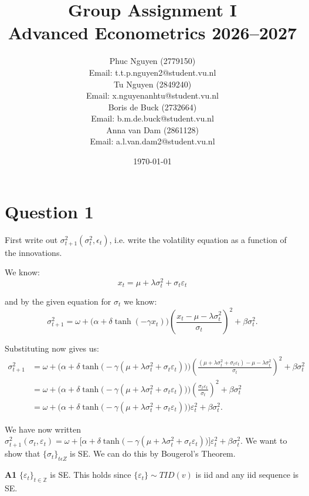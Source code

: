 \documentclass[a4paper, 12pt]{article}
\title{\Huge Group Assignment I\\[0.5em]\large Advanced Econometrics 2026--2027}
\author{\large Phuc Nguyen (2779150)\\\normalsize Email: t.t.p.nguyen2@student.vu.nl\\[0.3cm]
\large Tu Nguyen (2849240)\\\normalsize Email: x.nguyenanhtu@student.vu.nl\\[0.3cm]
\large Boris de Buck (2732664)\\\normalsize Email: b.m.de.buck@student.vu.nl\\[0.3cm]
\large Anna van Dam (2861128)\\\normalsize Email: a.l.van.dam2@student.vu.nl}
\date{\today}
\theoremstyle{definition}
\begin{document}
\maketitle
\newpage


\section*{Question 1}

First write out $\sigma^2_{t+1}(\sigma_t^2, \epsilon_t)$, i.e. write the volatility equation as a function of the
innovations.

We know:
\[x_t=\mu+\lambda\sigma_t^2+\sigma_t\varepsilon_t
\]

and by the given equation for $\sigma_t$ we know:
\[
\sigma_{t+1}^2=\omega+\Big(\alpha+\delta\tanh(-\gamma x_t)\Big)\left(\frac{x_t-\mu-\lambda\sigma_t^2}{\sigma_t}\right)^2+\beta\sigma_t^2.
\]

Substituting now gives us:
\begin{align*}
\sigma_{t+1}^2&=\omega+\Big(\alpha+\delta\tanh\big(-\gamma(\mu+\lambda\sigma_t^2+\sigma_t\varepsilon_t)\big)\Big)\left(\frac{(\mu+\lambda\sigma_t^2+\sigma_t\varepsilon_t)-\mu-\lambda\sigma_t^2}{\sigma_t}\right)^2+\beta\sigma_t^2 \\[4pt]
&=\omega+\Big(\alpha+\delta\tanh\big(-\gamma(\mu+\lambda\sigma_t^2+\sigma_t\varepsilon_t)\big)\Big)\left(\frac{\sigma_t\varepsilon_t}{\sigma_t}\right)^2+\beta\sigma_t^2 \\[4pt]
&=\omega+\Big(\alpha+\delta\tanh\big(-\gamma(\mu+\lambda\sigma_t^2+\sigma_t\varepsilon_t)\big)\Big)\varepsilon_t^2+\beta\sigma_t^2.
\end{align*}

We have now written $\sigma_{t+1}^2(\sigma_t, \varepsilon_t)=\omega+\Big[\alpha+\delta\tanh\big(-\gamma(\mu+\lambda\sigma_t^2+\sigma_t\varepsilon_t)\big)\Big]\varepsilon_t^2+\beta\sigma_t^2$. We want to show that $\{\sigma_t\}_{t\epsilon Z}$ is SE. We can do this by Bougerol's Theorem.

\bigskip

\noindent \textbf{A1} $\{\varepsilon_t\}_{t\in\mathbb{Z}}$ is SE. This holds since $\{\varepsilon_t\}\sim TID(v)$ is iid and any iid sequence is SE.

\bigskip
\end{document}
